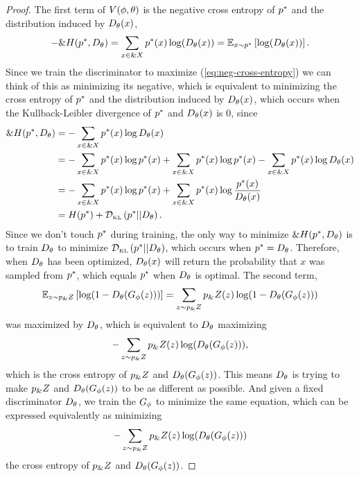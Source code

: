 \begin{proof}
  The first term of $V(\phi, \theta)$ is the negative cross entropy of $p^*$ and
  the distribution induced by $D_\theta(x)$,
\begin{align}
  \label{eq:neg-cross-entropy}
  - \&H(p^*, D_\theta) = \sum_{x \in \&X}p^*(x)\log(D_\theta(x)) = \mathbb{E}_{x \sim p^*} \left[\log(D_\theta(x))\right].
\end{align}
Since we train the discriminator to maximize
(\ref{eq:neg-cross-entropy}) we can think of this as minimizing its
negative, which is equivalent to minimizing the cross entropy of $p^*$
and the distribution induced by $D_\theta(x)$, which occurs when the
Kullback-Leibler divergence of $p^*$ and $D_\theta(x)$ is 0, since
\begin{align}
  \&H(p^*,D_\theta) & = - \sum_{x \in \&X} p^*(x) \log D_\theta(x) \\
                   & = -\sum_{x \in \&X} p^*(x) \log p^*(x) + \sum_{x \in \&X} p^*(x) \log p^*(x) - \sum_{x \in \&X} p^*(x) \log D_\theta(x) \\
                   & = -\sum_{x \in \&X} p^*(x) \log p^*(x) + \sum_{x \in \&X} p^*(x) \log {p^*(x)\over
                     D_\theta(x)}  \\
                   & = H(p^*) + \mathcal{D}_{\text{\tiny KL}}\left( p^* \middle| \middle| D_\theta \right).
\end{align}
Since we don't touch $p^*$ during training, the only way to minimize
$\&H(p^*,D_\theta)$ is to train $D_\theta$ to minimize $\mathcal{D}_{\text{\tiny KL}}\left( p^* \middle| \middle| D_\theta \right)$,
which occurs when $p^* = D_\theta$. Therefore, when $D_\theta$ has been
optimized, $D_\theta(x)$ will return the probability that $x$ was
sampled from $p^*$, which equals $p^*$ when $D_\theta$ is optimal. The
second term,
\begin{align}
  \mathbb{E}_{z \sim p_\&Z}\left[\log(1 - D_\theta(G_\phi(z)))\right] =
  \sum_{z \sim p_\&Z} p_\&Z(z) \log (1 - D_\theta(G_\phi(z)))
\end{align}
was maximized by $D_\theta$, which is equivalent to $D_\theta$ maximizing
\begin{align}
  -\sum_{z \sim p_\&Z} p_\&Z(z) \log (D_\theta(G_\phi(z))),
\end{align}
which is the cross entropy of $p_\&Z$ and $D_\theta(G_\phi(z))$. This means $D_\theta$ is trying
to make $p_\&Z$ and $D_\theta(G_\phi(z))$ to be as different as possible. And given a
fixed discriminator $D_\theta$, we train the $G_\phi$ to minimize the same equation, which
can be expressed equivalently as minimizing
\begin{align}
  -\sum_{z \sim p_\&Z} p_\&Z(z) \log (D_\theta(G_\phi(z)))
\end{align}
the cross entropy of $p_\&Z$ and $D_\theta(G_\phi(z))$.
\end{proof}

